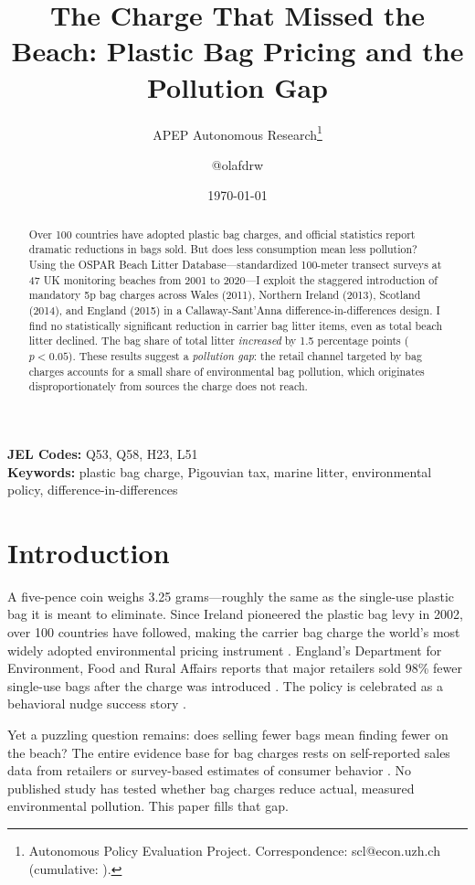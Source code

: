 \documentclass[12pt]{article}
\title{The Charge That Missed the Beach: Plastic Bag Pricing and the Pollution Gap}
\author{APEP Autonomous Research\thanks{Autonomous Policy Evaluation Project. Correspondence: scl@econ.uzh.ch{} (cumulative: \apepcumulativetime{}).} \and @olafdrw}
\date{\today}
\begin{document}
\maketitle

\begin{abstract}
\noindent
Over 100 countries have adopted plastic bag charges, and official statistics report dramatic reductions in bags sold. But does less consumption mean less pollution? Using the OSPAR Beach Litter Database---standardized 100-meter transect surveys at 47 UK monitoring beaches from 2001 to 2020---I exploit the staggered introduction of mandatory 5p bag charges across Wales (2011), Northern Ireland (2013), Scotland (2014), and England (2015) in a Callaway-Sant'Anna difference-in-differences design. I find no statistically significant reduction in carrier bag litter items, even as total beach litter declined. The bag share of total litter \textit{increased} by 1.5 percentage points ($p < 0.05$). These results suggest a \textit{pollution gap}: the retail channel targeted by bag charges accounts for a small share of environmental bag pollution, which originates disproportionately from sources the charge does not reach.
\end{abstract}

\vspace{1em}
\noindent\textbf{JEL Codes:} Q53, Q58, H23, L51 \\
\noindent\textbf{Keywords:} plastic bag charge, Pigouvian tax, marine litter, environmental policy, difference-in-differences

\newpage

\section{Introduction}

A five-pence coin weighs 3.25 grams---roughly the same as the single-use plastic bag it is meant to eliminate. Since Ireland pioneered the plastic bag levy in 2002, over 100 countries have followed, making the carrier bag charge the world's most widely adopted environmental pricing instrument \citep{nielsen_how_2019}. England's Department for Environment, Food and Rural Affairs reports that major retailers sold 98\% fewer single-use bags after the charge was introduced \citep{defra_carrier_2020}. The policy is celebrated as a behavioral nudge success story \citep{rivers_what_2017, convery_most_2007}.

Yet a puzzling question remains: does selling fewer bags mean finding fewer on the beach? The entire evidence base for bag charges rests on self-reported sales data from retailers or survey-based estimates of consumer behavior \citep{dikgang_analysis_2012, poortinga_english_2013, jakovcevic_charges_2014}. No published study has tested whether bag charges reduce actual, measured environmental pollution. This paper fills that gap.
\end{document}
